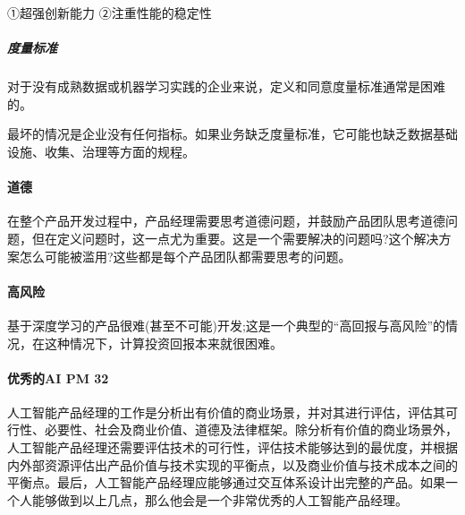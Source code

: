 \documentclass[letterpaper,11pt,english]{sphinxmanual}
\begin{document}
①超强创新能力 ②注重性能的稳定性


\subparagraph{度量标准}
\label{\detokenize{chapter_introduction/AI_PM:id28}}
对于没有成熟数据或机器学习实践的企业来说，定义和同意度量标准通常是困难的。

最坏的情况是企业没有任何指标。如果业务缺乏度量标准，它可能也缺乏数据基础设施、收集、治理等方面的规程。


\paragraph{道德}
\label{\detokenize{chapter_introduction/AI_PM:id29}}
在整个产品开发过程中，产品经理需要思考道德问题，并鼓励产品团队思考道德问题，但在定义问题时，这一点尤为重要。这是一个需要解决的问题吗?这个解决方案怎么可能被滥用?这些都是每个产品团队都需要思考的问题。



\paragraph{高风险}
\label{\detokenize{chapter_introduction/AI_PM:id30}}
基于深度学习的产品很难(甚至不可能)开发;这是一个典型的“高回报与高风险”的情况，在这种情况下，计算投资回报本来就很困难。


\paragraph{优秀的AI PM 32\sphinxfootnotemark[102]}
\label{\detokenize{chapter_introduction/AI_PM:ai-pm-32}}%
\begin{footnotetext}[102]\sphinxAtStartFootnote
{}
%
\end{footnotetext}\ignorespaces 
人工智能产品经理的工作是分析出有价值的商业场景，并对其进行评估，评估其可行性、必要性、社会及商业价值、道德及法律框架。除分析有价值的商业场景外，人工智能产品经理还需要评估技术的可行性，评估技术能够达到的最优度，并根据内外部资源评估出产品价值与技术实现的平衡点，以及商业价值与技术成本之间的平衡点。最后，人工智能产品经理应能够通过交互体系设计出完整的产品。如果一个人能够做到以上几点，那么他会是一个非常优秀的人工智能产品经理。
\end{document}

